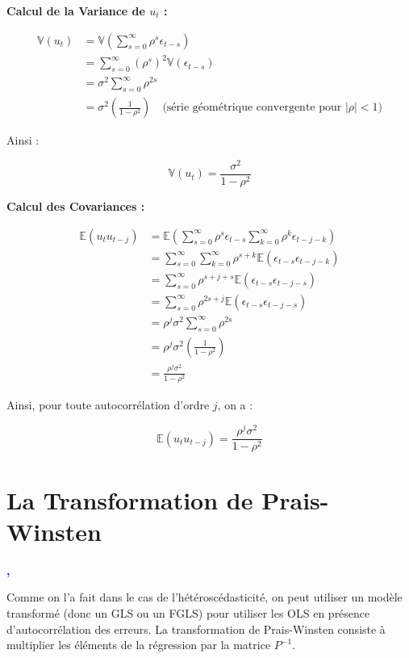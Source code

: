 \documentclass[14pt]{extarticle} %
\theoremstyle{definition}
\theoremstyle{plain}
\begin{document}
\textbf{Calcul de la Variance de $u_t$ :}

\begin{align}
\mathbb{V}(u_t) &= \mathbb{V}\left( \sum_{s=0}^{\infty} \rho^s \epsilon_{t-s} \right) \nonumber \\
&= \sum_{s=0}^{\infty} (\rho^s)^2 \mathbb{V}(\epsilon_{t-s}) \nonumber \\
&= \sigma^2 \sum_{s=0}^{\infty} \rho^{2s} \nonumber \\
&= \sigma^2 \left( \frac{1}{1 - \rho^2} \right) \quad \text{(série géométrique convergente pour } |\rho| < 1) \label{eq:variance_ut}
\end{align}

Ainsi :

\[
\mathbb{V}(u_t) = \frac{\sigma^2}{1 - \rho^2}
\]

\textbf{Calcul des Covariances :}

\begin{align}
\mathbb{E}(u_t u_{t-j}) &= \mathbb{E}\left( \sum_{s=0}^{\infty} \rho^s \epsilon_{t-s} \sum_{k=0}^{\infty} \rho^k \epsilon_{t-j-k} \right) \nonumber \\
&= \sum_{s=0}^{\infty} \sum_{k=0}^{\infty} \rho^{s+k} \mathbb{E}(\epsilon_{t-s} \epsilon_{t-j-k}) \nonumber \\
&= \sum_{s=0}^{\infty} \rho^{s+j+s} \mathbb{E}(\epsilon_{t-s} \epsilon_{t-j-s}) \nonumber \\
&= \sum_{s=0}^{\infty} \rho^{2s+j} \mathbb{E}(\epsilon_{t-s} \epsilon_{t-j-s}) \nonumber \\
&= \rho^j \sigma^2 \sum_{s=0}^{\infty} \rho^{2s} \nonumber \\
&= \rho^j \sigma^2 \left( \frac{1}{1 - \rho^2} \right) \nonumber \\
&= \frac{\rho^j \sigma^2}{1 - \rho^2} \label{eq:covariance_ut_uj}
\end{align}

Ainsi, pour toute autocorrélation d'ordre $j$, on a :

\[
\mathbb{E}(u_t u_{t-j}) = \frac{\rho^j \sigma^2}{1 - \rho^2}
\]

\section{La Transformation de Prais-Winsten}

\textbf{\textcolor{blue}{\cite{gujarati2010}, \cite{wooldridge2010}}}

Comme on l’a fait dans le cas de l’hétéroscédasticité, on peut utiliser un modèle transformé (donc un GLS ou un FGLS) pour utiliser les OLS en présence d’autocorrélation des erreurs. La transformation de Prais-Winsten consiste à multiplier les éléments de la régression par la matrice $P^{-1}$.
\end{document}
